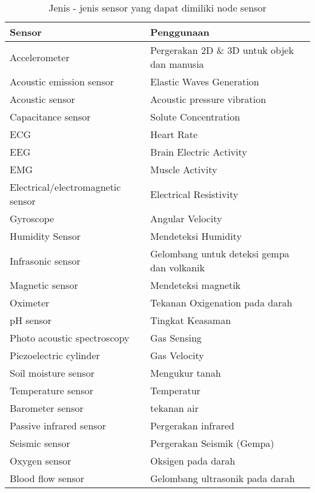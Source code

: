 \begin{table} [H]
	\centering 
	\caption{Jenis - jenis sensor yang dapat dimiliki node sensor}
	\label{tab:sensor}
	\begin{tabular}{|p{6cm}|p{9cm}|}
        \hline
		Sensor & Penggunaan\\
        \hline
		Accelerometer & Pergerakan 2D \& 3D untuk objek dan manusia  \\
		Acoustic emission sensor & Elastic Waves Generation\\
		Acoustic sensor   & Acoustic pressure vibration\\
		Capacitance sensor  & Solute Concentration\\
		ECG   & Heart Rate\\
		EEG  & Brain Electric Activity\\
		EMG   & Muscle Activity\\
		Electrical/electromagnetic sensor & Electrical Resistivity\\
		Gyroscope  & Angular Velocity \\
		Humidity Sensor   & Mendeteksi Humidity\\
		Infrasonic sensor  &  Gelombang untuk deteksi gempa dan volkanik\\
		Magnetic sensor   & Mendeteksi magnetik\\
		Oximeter   & Tekanan Oxigenation pada darah  \\
		pH sensor  & Tingkat Keasaman\\
		Photo acoustic spectroscopy   & Gas Sensing\\
		Piezoelectric cylinder    &  Gas Velocity\\
		Soil moisture sensor   &  Mengukur tanah\\
		Temperature sensor   & Temperatur \\
		Barometer sensor  &  tekanan air\\
		Passive infrared sensor  & Pergerakan infrared\\
		Seismic sensor   & Pergerakan Seismik (Gempa) \\
		Oxygen sensor  & Oksigen pada darah \\
		Blood flow sensor  & Gelombang ultrasonik pada darah \\
        \hline
		
	\end{tabular} 
\end{table}

